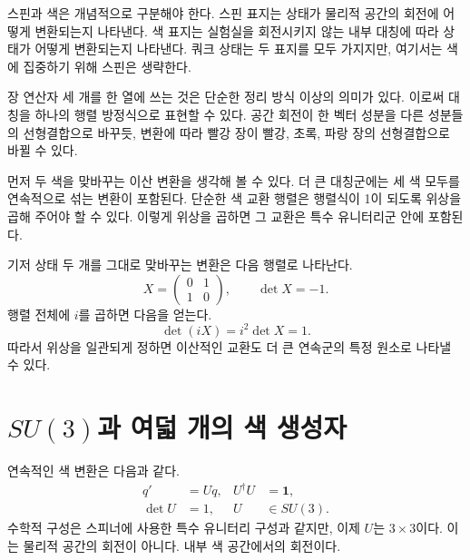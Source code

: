 스핀과 색은 개념적으로 구분해야 한다. 스핀 표지는 상태가 물리적 공간의 회전에 어떻게 변환되는지 나타낸다. 색 표지는 실험실을 회전시키지 않는 내부 대칭에 따라 상태가 어떻게 변환되는지 나타낸다. 쿼크 상태는 두 표지를 모두 가지지만, 여기서는 색에 집중하기 위해 스핀은 생략한다.

장 연산자 세 개를 한 열에 쓰는 것은 단순한 정리 방식 이상의 의미가 있다. 이로써 대칭을 하나의 행렬 방정식으로 표현할 수 있다. 공간 회전이 한 벡터 성분을 다른 성분들의 선형결합으로 바꾸듯, 변환에 따라 빨강 장이 빨강, 초록, 파랑 장의 선형결합으로 바뀔 수 있다.

먼저 두 색을 맞바꾸는 이산 변환을 생각해 볼 수 있다. 더 큰 대칭군에는 세 색 모두를 연속적으로 섞는 변환이 포함된다. 단순한 색 교환 행렬은 행렬식이 1이 되도록 위상을 곱해 주어야 할 수 있다. 이렇게 위상을 곱하면 그 교환은 특수 유니터리군 안에 포함된다.

기저 상태 두 개를 그대로 맞바꾸는 변환은 다음 행렬로 나타난다.
\begin{equation}
X=
\begin{pmatrix}0&1\\1&0\end{pmatrix},
\qquad
\det X=-1.
\end{equation}
행렬 전체에 \(i\)를 곱하면 다음을 얻는다.
\begin{equation}
\det(iX)=i^2\det X=1.
\end{equation}
따라서 위상을 일관되게 정하면 이산적인 교환도 더 큰 연속군의 특정 원소로 나타낼 수 있다.

\begin{classroomqa}
\end{classroomqa}

\section{\texorpdfstring{\(SU(3)\)}{SU(3)}과 여덟 개의 색 생성자}

연속적인 색 변환은 다음과 같다.
\begin{equation}
\begin{aligned}
q'&=Uq,
&
U^\dagger U&=\boldsymbol 1,
\\
\det U&=1,
&
U&\in SU(3).
\end{aligned}
\label{eq:l3-su3-action}
\end{equation}
수학적 구성은 스피너에 사용한 특수 유니터리 구성과 같지만, 이제 \(U\)는 \(3\times3\)이다. 이는 물리적 공간의 회전이 아니다. 내부 색 공간에서의 회전이다.

